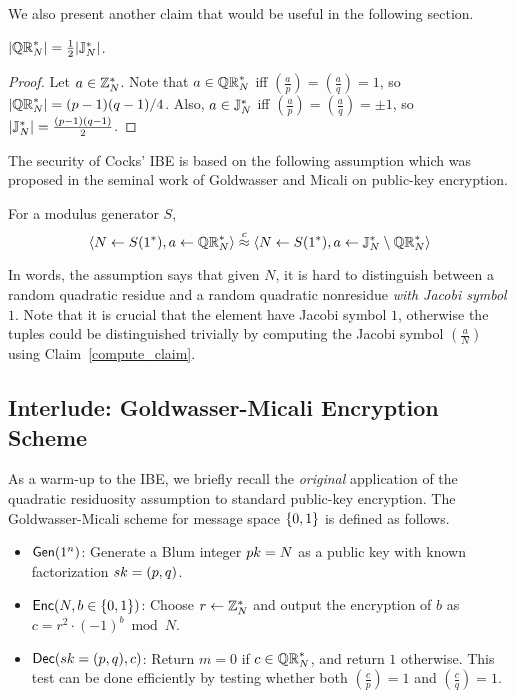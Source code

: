\documentclass[11pt]{article}
\begin{document}
We also present another claim that would be useful in the following
section.

\begin{claim}
  \label{equal_claim}
  $\lvert\mathbb{QR}_{N}^*\rvert = \tfrac12 \lvert\mathbb{J}_N^*\rvert$.
\end{claim}

\begin{proof}
  Let $a \in \mathbb{Z}_N^*$.  Note that $a \in \mathbb{QR}_{N}^*$ iff $\left(
    \frac{a}{p} \right) = \left( \frac{a}{q} \right) = 1$, so
  $\lvert\mathbb{QR}_{N}^{*}\rvert = (p-1)(q-1)/4$.  Also, $a \in \mathbb{J}_N^*$ iff $\left(
    \frac{a}{p}\right) = \left( \frac{a}{q}\right) = \pm 1$, so
  $\lvert\mathbb{J}_N^*\rvert = \frac{(p-1)(q-1)}{2}$.
\end{proof}

The security of Cocks' IBE is based on the following assumption which
was proposed in the seminal work of Goldwasser and Micali on
public-key encryption.

\begin{conjecture}
  \label{QR_conjecture}
  For a modulus generator $S$,
  \[ \left\langle N \leftarrow S(1^*), a \leftarrow \mathbb{QR}_{N}^*
  \right\rangle \stackrel{c}{\approx} \left\langle N \leftarrow S(1^*), a
    \leftarrow \mathbb{J}_N^* \setminus \mathbb{QR}_{N}^* \right\rangle\]
\end{conjecture}

In words, the assumption says that given $N$, it is hard to
distinguish between a random quadratic residue and a random quadratic
nonresidue \emph{with Jacobi symbol $1$}.  Note that it is crucial
that the element have Jacobi symbol $1$, otherwise the tuples could be
distinguished trivially by computing the Jacobi symbol $\left(
  \frac{a}{N} \right)$ using Claim~\ref{compute_claim}.

\subsection{Interlude: Goldwasser-Micali Encryption Scheme}
\label{sec:goldw-micali-pkc}

As a warm-up to the IBE, we briefly recall the \emph{original}
application of the quadratic residuosity assumption to standard
public-key encryption.  The Goldwasser-Micali scheme for message space
$\{0,1\}$ is defined as follows.
\begin{itemize}
\item $\mathsf{Gen}(1^n)$: Generate a Blum integer $pk = N$ as a public
  key with known factorization $sk = (p,q)$.
\item $\mathsf{Enc}(N,b \in \{0,1\})$: Choose $r \gets \mathbb{Z}_N^*$ and output the
  encryption of $b$ as $c = r^2 \cdot (-1)^b \bmod N$.
\item $\mathsf{Dec}(sk = (p,q), c)$: Return $m = 0$ if $c \in \mathbb{QR}_{N}^*$, and
  return $1$ otherwise.  This test can be done efficiently by testing
  whether both $\left( \frac{c}{p} \right) = 1$ and $\left(
    \frac{c}{q} \right) = 1$.
\end{itemize}
\end{document}
